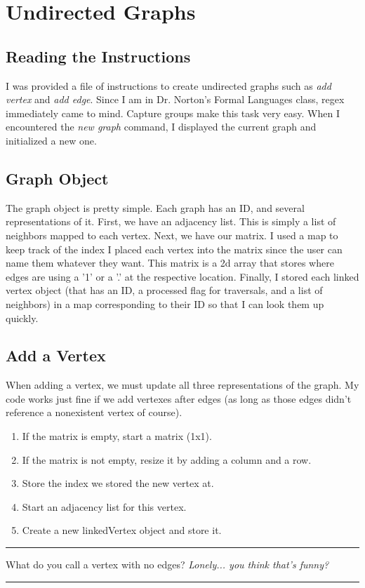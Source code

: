 \documentclass[letterpaper, 10pt]{article}
\begin{document}
\newpage

\section{Undirected Graphs}
\subsection{Reading the Instructions}
I was provided a file of instructions to create undirected graphs such as \textit{add vertex} and \textit{add edge}. Since I am in Dr. Norton's Formal Languages class, regex immediately came to mind. Capture groups make this task very easy. When I encountered the \textit{new graph} command, I displayed the current graph and initialized a new one. 


\subsection{Graph Object}
The graph object is pretty simple. Each graph has an ID, and several representations of it. First, we have an adjacency list. This is simply a list of neighbors mapped to each vertex. Next, we have our matrix. I used a map to keep track of the index I placed each vertex into the matrix since the user can name them whatever they want. This matrix is a 2d array that stores where edges are using a '1' or a '.' at the respective location. Finally, I stored each linked vertex object (that has an ID, a processed flag for traversals, and a list of neighbors) in a map corresponding to their ID so that I can look them up quickly. 



\subsection{Add a Vertex}
When adding a vertex, we must update all three representations of the graph. My code works just fine if we add vertexes after edges (as long as those edges didn't reference a nonexistent vertex of course). 
\begin{enumerate}
    \item If the matrix is empty, start a matrix (1x1).
    \item If the matrix is not empty, resize it by adding a column and a row.
    \item Store the index we stored the new vertex at.
    \item Start an adjacency list for this vertex.
    \item Create a new linkedVertex object and store it.
\end{enumerate}

\hrule
\vspace{.25cm}
What do you call a vertex with no edges? \textit{Lonely... you think that's funny?}\\
\hrule
\vspace{.5cm}
\end{document}
